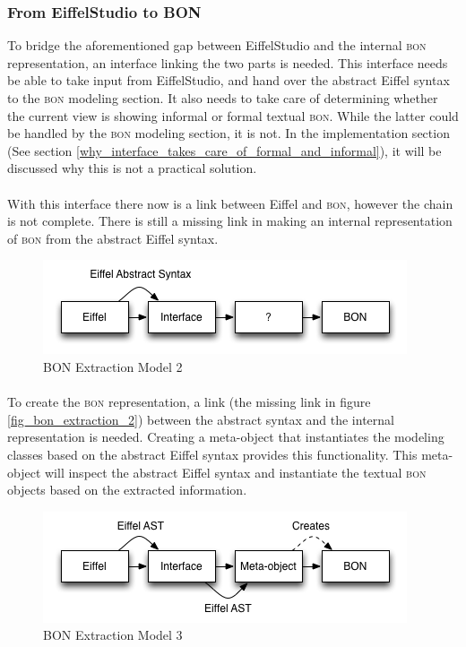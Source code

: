 \subsubsection{From EiffelStudio to BON}
To bridge the aforementioned gap between EiffelStudio and the internal \textsc{bon} representation, an interface linking the two parts is needed. This interface needs be able to take input from EiffelStudio, and hand over the abstract Eiffel syntax to the \textsc{bon} modeling section. It also needs to take care of determining whether the current view is showing informal or formal textual \textsc{bon}. While the latter could be handled by the \textsc{bon} modeling section, it is not. In the implementation section (See section \ref{why_interface_takes_care_of_formal_and_informal}),  it will be discussed why this is not a practical solution.

\paragraph{}
With this interface there now is a link between Eiffel and \textsc{bon}, however the chain is not complete. There is still a missing link in making an internal representation of \textsc{bon} from the abstract Eiffel syntax.
\begin{figure}[H]
\centering
\includegraphics[scale=0.8]{images/BON-extraction-model-2.png}
\caption{BON Extraction Model 2}
\label{fig:bon_extraction_2}
\end{figure}

\paragraph{}
To create the \textsc{bon} representation, a link (the missing link in figure \ref{fig_bon_extraction_2}) between the abstract syntax and the internal representation is needed. Creating a meta-object that instantiates the modeling classes based on the abstract Eiffel syntax provides this functionality. This meta-object will inspect the abstract Eiffel syntax and instantiate the textual \textsc{bon} objects based on the extracted information.
\begin{figure}[H]
\centering
\includegraphics[scale=0.8]{images/BON-extraction-model-3.png}
\caption{BON Extraction Model 3}
\label{fig:bon_extraction_3}
\end{figure}

